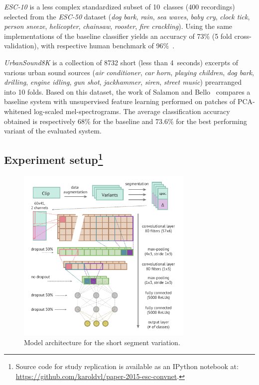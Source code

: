 \documentclass{article}
\begin{document}
\textit{ESC-10} is a less complex standardized subset of 10~classes (400 recordings) selected from the \textit{ESC-50} dataset (\textit{dog bark}, \textit{rain}, \textit{sea waves}, \textit{baby cry}, \textit{clock tick}, \textit{person sneeze}, \textit{helicopter}, \textit{chainsaw}, \textit{rooster}, \textit{fire crackling}). Using the same implementations of the baseline classifier yields an accuracy of 73\% (5 fold cross-validation), with respective human benchmark of 96\%~\cite{piczak2015esc}.

\textit{UrbanSound8K} is a collection of 8732 short (less than 4~seconds) excerpts of various urban sound sources (\textit{air conditioner}, \textit{car horn}, \textit{playing children}, \textit{dog bark}, \textit{drilling}, \textit{engine idling}, \textit{gun shot}, \textit{jackhammer}, \textit{siren}, \textit{street music}) prearranged into 10 folds. Based on this dataset, the work of Salamon and Bello~\cite{salamon2015unsupervised} compares a baseline system with unsupervised feature learning performed on patches of PCA-whitened log-scaled mel-spectrograms. The average classification accuracy obtained is respectively 68\% for the baseline and 73.6\% for the best performing variant of the evaluated system.

\subsection[Experiment setup]{Experiment setup\footnote{Source code for study replication is available as an IPython notebook at:\\\href{https://github.com/karoldvl/paper-2015-esc-convnet}{https://github.com/karoldvl/paper-2015-esc-convnet}.}}

\begin{figure}[!t]
\centering
\includegraphics[width=20pc]{Figures/Architecture.pdf}
\caption{\label{fig:architecture}Model architecture for the short segment variation.}
\end{figure}
\end{document}
